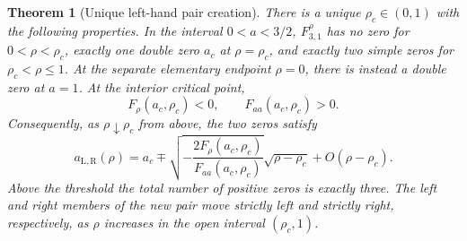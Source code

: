 \documentclass[11pt]{article}
\numberwithin{equation}{section}
\newtheorem{theorem}{Theorem}[section]
\theoremstyle{definition}\newtheorem{definition}[theorem]{Definition}
\theoremstyle{remark}\newtheorem{remark}[theorem]{Remark}
\begin{document}
\begin{theorem}[Unique left-hand pair creation]\label{thm:n3fold}
There is a unique $\rho_c\in(0,1)$ with the following properties. In the interval $0<a<3/2$, $F_{3,1}^{\rho}$ has no zero for $0<\rho<\rho_c$, exactly one double zero $a_c$ at $\rho=\rho_c$, and exactly two simple zeros for $\rho_c<\rho\leq1$. At the separate elementary endpoint $\rho=0$, there is instead a double zero at $a=1$. At the interior critical point,
\[
F_\rho(a_c,\rho_c)<0,\qquad F_{aa}(a_c,\rho_c)>0.
\]
Consequently, as $\rho\downarrow\rho_c$ from above, the two zeros satisfy
\begin{equation}\label{eq:fold}
a_{\mathrm L,\mathrm R}(\rho)=a_c\mp
\sqrt{-\frac{2F_\rho(a_c,\rho_c)}{F_{aa}(a_c,\rho_c)}}\sqrt{\rho-\rho_c}
+O(\rho-\rho_c).
\end{equation}
Above the threshold the total number of positive zeros is exactly three. The left and right members of the new pair move strictly left and strictly right, respectively, as $\rho$ increases in the open interval $(\rho_c,1)$.
\end{theorem}
\end{document}
